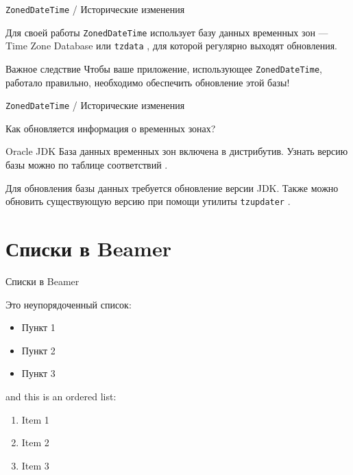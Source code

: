 \documentclass{beamer}
\begin{document}
\begin{frame}[fragile]{{\tt ZonedDateTime} / Исторические изменения}

  Для своей работы {\tt ZonedDateTime} использует базу данных временных зон --- Time Zone Database или {\tt tzdata} \cite{tzdata}, для которой регулярно выходят обновления.

    \begin{alertblock}{Важное следствие}
     	Чтобы ваше приложение, использующее {\tt ZonedDateTime}, работало правильно, необходимо обеспечить обновление этой базы!
    \end{alertblock}

\end{frame}

\begin{frame}[fragile]{{\tt ZonedDateTime} / Исторические изменения}

  Как обновляется информация о временных зонах?

  \begin{block}{Oracle JDK}
  	База данных временных зон включена в дистрибутив. Узнать версию базы можно по таблице соответствий \cite{oracle_tzdata}. 
  	
  	Для обновления базы данных требуется обновление версии JDK. Также можно обновить существующую версию при помощи утилиты {\tt tzupdater} \cite{tzupdater}.
  \end{block}

\end{frame}

\section{Списки в Beamer}
\begin{frame}{Списки в Beamer}

Это неупорядоченный список:
\begin{itemize}
    \item Пункт 1
    \item Пункт 2
    \item Пункт 3
\end{itemize}

and this is an ordered list:
\begin{enumerate}
    \item Item 1
    \item Item 2
    \item Item 3
\end{enumerate}

\end{frame}
\end{document}
